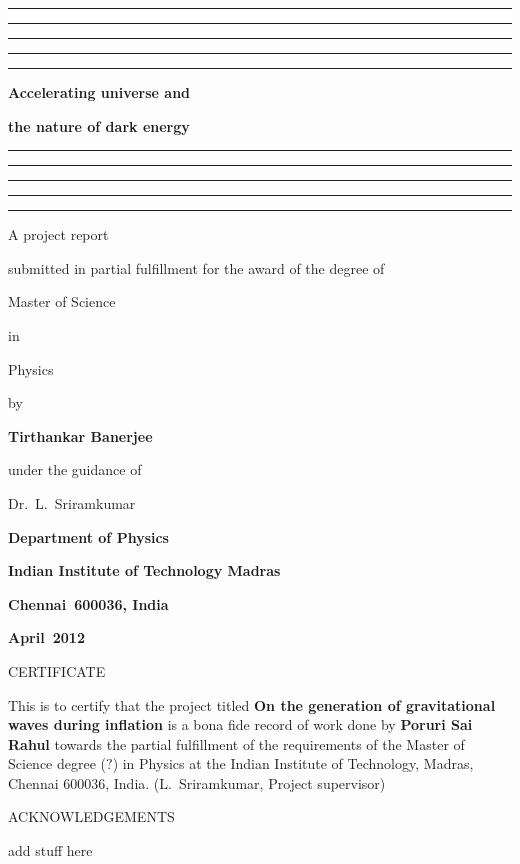 \documentclass[12pt,a4paper,oneside]{book}
\begin{document}

\baselineskip 20pt




\thispagestyle{empty}
\topskip 15pt
\hrule\hrule\hrule\hrule\hrule
\vskip 20pt
\centerline{\Huge \bf Accelerating universe and} 
\vskip 15pt
\centerline{\Huge \bf the nature of dark energy} 
\vskip 20pt
\hrule\hrule\hrule\hrule\hrule
\vskip 30pt
\centerline{\Large A project report}
\vskip 8pt
\centerline{\Large submitted in partial fulfillment 
for the award of the degree of}
\vskip 8pt
\centerline{\Large Master of Science}
\vskip 8pt
\centerline{\Large in}
\vskip 8pt 
\centerline{\Large Physics}
\vskip 8pt
\centerline{\Large by}
\vskip 8pt
\centerline{\Large \bf Tirthankar Banerjee}
\vskip 8pt
\centerline{\Large under the guidance of}
\vskip 8pt
\centerline{\Large  Dr.~L.~Sriramkumar}
\vskip 30pt 
\begin{center}
\end{center}
\vskip 8pt 
\centerline{\Large \bf Department of Physics}
\vskip 8pt 
\centerline{\Large \bf Indian Institute of Technology Madras}
\vskip 8pt 
\centerline{\Large \bf Chennai~600036, India}
\vskip 8pt
\centerline{\Large \bf April~2012}

\newpage\topskip 40pt
\centerline{\Large CERTIFICATE}
\thispagestyle{empty}
\vskip 20pt\noindent 
This is to certify that the project titled {\bf On the generation of
gravitational waves during inflation} is a bona fide record of work done by 
{\bf Poruri Sai Rahul} towards the partial fulfillment of the 
requirements of the Master of Science degree ($?$) in Physics at the Indian 
Institute of Technology, Madras, Chennai 600036, India.
\vskip 120pt
\hspace{240pt}(L.~Sriramkumar, Project supervisor)


\newpage\topskip 40pt
\thispagestyle{empty}
\centerline{\Large ACKNOWLEDGEMENTS}
\vskip 20pt\noindent 
add stuff here

\end{document}
